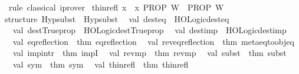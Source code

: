 \begin{isabellebody}
\ {\isacharparenleft}{\kern0pt}rule\ classical{\isacharparenright}{\kern0pt}\ iprover%
\endisatagproof
{\isafoldproof}%
%
\isadelimproof
\isanewline
%
\endisadelimproof
\isanewline
{}\isamarkupfalse%
\ thin{\isacharunderscore}{\kern0pt}refl{\isacharcolon}{\kern0pt}\ {\isachardoublequoteopen}{\isasymlbrakk}x\ {\isacharequal}{\kern0pt}\ x{\isacharsemicolon}{\kern0pt}\ PROP\ W{\isasymrbrakk}\ {\isasymLongrightarrow}\ PROP\ W{\isachardoublequoteclose}%
\isadelimproof
\ %
\endisadelimproof
%
\isatagproof
\isacommand{{\isachardot}{\kern0pt}}\isamarkupfalse%
%
\endisatagproof
{\isafoldproof}%
%
\isadelimproof
%
\endisadelimproof
\isanewline
%
\isadelimML
\isanewline
%
\endisadelimML
%
\isatagML
{}\isamarkupfalse%
\ {\isacartoucheopen}\isanewline
structure\ Hypsubst\ {\isacharequal}{\kern0pt}\ Hypsubst\isanewline
{\isacharparenleft}{\kern0pt}\isanewline
\ \ val\ dest{\isacharunderscore}{\kern0pt}eq\ {\isacharequal}{\kern0pt}\ HOLogic{\isachardot}{\kern0pt}dest{\isacharunderscore}{\kern0pt}eq\isanewline
\ \ val\ dest{\isacharunderscore}{\kern0pt}Trueprop\ {\isacharequal}{\kern0pt}\ HOLogic{\isachardot}{\kern0pt}dest{\isacharunderscore}{\kern0pt}Trueprop\isanewline
\ \ val\ dest{\isacharunderscore}{\kern0pt}imp\ {\isacharequal}{\kern0pt}\ HOLogic{\isachardot}{\kern0pt}dest{\isacharunderscore}{\kern0pt}imp\isanewline
\ \ val\ eq{\isacharunderscore}{\kern0pt}reflection\ {\isacharequal}{\kern0pt}\ {\isacharat}{\kern0pt}{\isacharbraceleft}{\kern0pt}thm\ eq{\isacharunderscore}{\kern0pt}reflection{\isacharbraceright}{\kern0pt}\isanewline
\ \ val\ rev{\isacharunderscore}{\kern0pt}eq{\isacharunderscore}{\kern0pt}reflection\ {\isacharequal}{\kern0pt}\ {\isacharat}{\kern0pt}{\isacharbraceleft}{\kern0pt}thm\ meta{\isacharunderscore}{\kern0pt}eq{\isacharunderscore}{\kern0pt}to{\isacharunderscore}{\kern0pt}obj{\isacharunderscore}{\kern0pt}eq{\isacharbraceright}{\kern0pt}\isanewline
\ \ val\ imp{\isacharunderscore}{\kern0pt}intr\ {\isacharequal}{\kern0pt}\ {\isacharat}{\kern0pt}{\isacharbraceleft}{\kern0pt}thm\ impI{\isacharbraceright}{\kern0pt}\isanewline
\ \ val\ rev{\isacharunderscore}{\kern0pt}mp\ {\isacharequal}{\kern0pt}\ {\isacharat}{\kern0pt}{\isacharbraceleft}{\kern0pt}thm\ rev{\isacharunderscore}{\kern0pt}mp{\isacharbraceright}{\kern0pt}\isanewline
\ \ val\ subst\ {\isacharequal}{\kern0pt}\ {\isacharat}{\kern0pt}{\isacharbraceleft}{\kern0pt}thm\ subst{\isacharbraceright}{\kern0pt}\isanewline
\ \ val\ sym\ {\isacharequal}{\kern0pt}\ {\isacharat}{\kern0pt}{\isacharbraceleft}{\kern0pt}thm\ sym{\isacharbraceright}{\kern0pt}\isanewline
\ \ val\ thin{\isacharunderscore}{\kern0pt}refl\ {\isacharequal}{\kern0pt}\ {\isacharat}{\kern0pt}{\isacharbraceleft}{\kern0pt}thm\ thin{\isacharunderscore}{\kern0pt}refl{\isacharbraceright}{\kern0pt}{\isacharsemicolon}{\kern0pt}\isanewline

\end{isabellebody}
